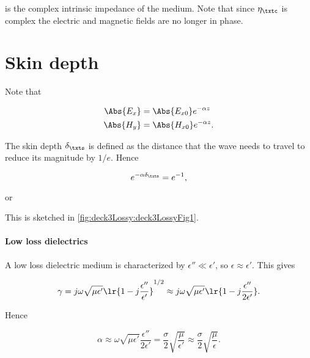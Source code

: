 is the complex intrinsic impedance of the medium.  Note that since \( \eta_\txtc \) is complex the electric and magnetic fields are no longer in phase.

\section{Skin depth}

Note that

\begin{equation}\label{eqn:uwavesLecture3:260}
\begin{aligned}
\Abs{ E_x } &= \Abs{ E_{x0} } e^{-\alpha z} \\
\Abs{ H_y } &= \Abs{ H_{x0} } e^{-\alpha z}.
\end{aligned}
\end{equation}

The skin depth \( \delta_\txts \) is defined as the distance that the wave needs to travel to reduce its magnitude by \( 1/e \).  Hence

\begin{equation}\label{eqn:uwavesLecture3:280}
e^{ -\alpha \delta_\txts } = e^{-1},
\end{equation}

or


This is sketched in \cref{fig:deck3Lossy:deck3LossyFig1}.


\paragraph{Low loss dielectrics}

A low loss dielectric medium is characterized by \( \epsilon'' \ll \epsilon' \), so \( \epsilon \approx \epsilon' \).  This gives

\begin{dmath}\label{eqn:uwavesLecture3:320}
\gamma
=
j \omega \sqrt{\mu \epsilon' } \lr{ 1 -j \frac{\epsilon''}{\epsilon'}}^{1/2}
\approx
j \omega \sqrt{\mu \epsilon' } \lr{ 1 - j \frac{\epsilon''}{2 \epsilon'}}.
\end{dmath}

Hence

\begin{dmath}\label{eqn:uwavesLecture3:340}
\alpha
\approx
\omega \sqrt{\mu \epsilon'} \frac{\epsilon''}{2 \epsilon'}
=
\frac{\sigma}{2} \sqrt{\frac{\mu}{\epsilon'}}
\approx
\frac{\sigma}{2} \sqrt{\frac{\mu}{\epsilon}}.
\end{dmath}

